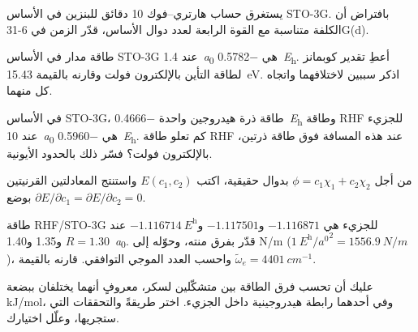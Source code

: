 \begin{exercise}[$\star\star$]\label{exo:b3:computational-chemistry:7}
يستغرق حساب هارتري--فوك 10 دقائق للبنزين في الأساس STO-3G. بافتراض
أن الكلفة متناسبة مع القوة الرابعة لعدد دوال الأساس،
قدّر الزمن في 6-31G(d).
\end{exercise}

\begin{exercise}[$\star\star$]\label{exo:b3:computational-chemistry:8}
طاقة مدار  في الأساس STO-3G عند \qty{1.4}{\bohr} هي
\qty{-0.5782}{\hartree}. أعطِ تقدير كوبمانز لطاقة التأين بالإلكترون فولت
وقارنه بالقيمة \qty{15.43}{eV}. اذكر سببين لاختلافهما واتجاه
كل منهما.
\end{exercise}

\begin{exercise}[$\star\star$]\label{exo:b3:computational-chemistry:9}
في الأساس STO-3G، طاقة ذرة هيدروجين واحدة \qty{-0.4666}{\hartree} وطاقة RHF
للجزيء  عند \qty{10}{\bohr} هي \qty{-0.5960}{\hartree}. كم تعلو طاقة RHF عند هذه المسافة
فوق طاقة ذرتين، بالإلكترون فولت؟ فسّر ذلك بالحدود
الأيونية.
\end{exercise}

\begin{exercise}[$\star\star\star$]\label{exo:b3:computational-chemistry:10}
من أجل $\phi = c_1\chi_1 + c_2\chi_2$ بدوال حقيقية، اكتب $E(c_1,c_2)$ 
واستنتج المعادلتين القرنيتين بوضع $\partial E/\partial c_1 =
\partial E/\partial c_2 = 0$.
\end{exercise}

\begin{exercise}[$\star\star\star$]\label{exo:b3:computational-chemistry:11}
طاقة RHF/STO-3G للجزيء  هي $-1.116871$ و$-1.117501$ 
و$\qty{-1.116714}{\hartree}$ عند $R = 1.30$ و1.35 و\qty{1.40}{\bohr}. قدّر
 بفرق منته، وحوّله إلى \unit{N/m}
($\qty{1}{\hartree\per\bohr\squared} = \qty{1556.9}{N/m}$)، واحسب
العدد الموجي التوافقي. قارنه بالقيمة $\tilde\omega_e = \qty{4401}{cm^{-1}}$.
\end{exercise}

\begin{exercise}[$\star\star\star$]\label{exo:b3:computational-chemistry:12}
عليك أن تحسب فرق الطاقة بين متشكّلين لسكر،
معروفٍ أنهما يختلفان ببضعة \unit{kJ/mol}، وفي أحدهما رابطة هيدروجينية
داخل الجزيء. اختر طريقةً  والتحققات التي
ستجريها، وعلّل اختيارك.
\end{exercise}

